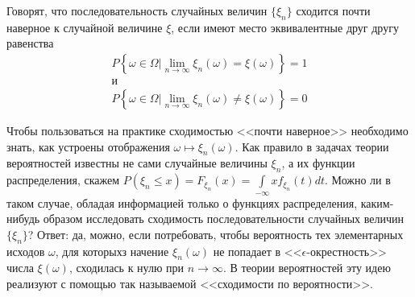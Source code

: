 \begin{definition}
	Говорят, что последовательность случайных величин $\{\xi_n\}$ сходится почти наверное к случайной величине $\xi$, если имеют
место эквивалентные друг другу равенства
\begin{gather*}
	P\left\{\omega\in\Omega| \lim\limits_{n\to\infty}\xi_n(\omega)=\xi(\omega) \right\}=1 \\
	\text{и} \\
	P\left\{\omega\in\Omega| \lim\limits_{n\to\infty}\xi_n(\omega)\neq\xi(\omega) \right\}=0
\end{gather*}
\end{definition}
\begin{remark}\label{rem:21.5}
Чтобы пользоваться на практике сходимостью <<почти наверное>> необходимо знать, как устроены отображения $\omega \mapsto \xi_n(\omega)$.
Как правило в задачах теории вероятностей известны не сами случайные
величины $\xi_n$, а их функции распределения, скажем $P(\xi_n \leqslant x) = F_{\xi_n}(x) =\int\limits_{-\infty}{x}f_{\xi_n}(t)dt$. Можно ли в таком случае, обладая информацией только о функциях распределения, каким-нибудь образом исследовать сходимость последовательности случайных величин $\{\xi_n\}$? Ответ: да, можно, если потребовать, чтобы вероятность тех элементарных исходов $\omega$, для которыхз начение $\xi_n(\omega)$ не попадает в <<$\epsilon$-окрестность>> числа $\xi(\omega)$, сходилась к нулю при $n \to \infty$. В теории вероятностей эту идею реализуют с помощью так называемой <<сходимости по вероятности>>.
\end{remark}

